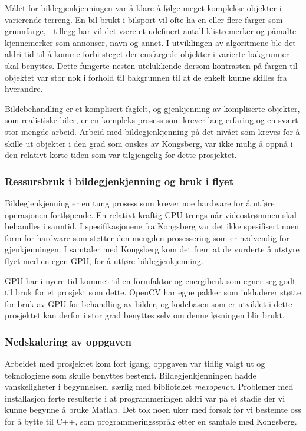 Målet for bildegjenkjenningen var å klare å følge meget komplekse objekter i varierende terreng. En bil brukt i bilsport vil ofte ha en eller flere farger som grunnfarge, i tillegg har vil det være et udefinert antall klistremerker og påmalte kjennemerker som annonser, navn og annet. I utviklingen av algoritmene ble det aldri tid til å komme forbi steget der ensfargede objekter i varierte bakgrunner skal benyttes. Dette fungerte nesten utelukkende dersom kontrasten på fargen til objektet var stor nok i forhold til bakgrunnen til at de enkelt kunne skilles fra hverandre.

Bildebehandling er et komplisert fagfelt, og gjenkjenning av kompliserte objekter, som realistiske biler, er en kompleks prosess som krever lang erfaring og en svært stor mengde arbeid. Arbeid med bildegjenkjenning på det nivået som kreves for å skille ut objekter i den grad som ønskes av Kongsberg, var ikke mulig å oppnå i den relativt korte tiden som var tilgjengelig for dette prosjektet.

\subsubsection{Ressursbruk i bildegjenkjenning og bruk i flyet}

Bildegjenkjenning er en tung prosess som krever noe hardware for å utføre operasjonen fortløpende. En relativt kraftig CPU trengs når videostrømmen skal behandles i sanntid. I spesifikasjonene fra Kongsberg \cite{LocalHawkPDF} var det ikke spesifisert noen form for hardware som støtter den mengden prosessering som er nødvendig for gjenkjenningen. I samtaler med Kongsberg kom det frem at de vurderte å utstyre flyet med en egen GPU, for å utføre bildegjenkjenning. 

GPU har i nyere tid kommet til en formfaktor og energibruk som egner seg godt til bruk for et prosjekt som dette. OpenCV har egne pakker som inkluderer støtte for bruk av GPU for behandling av bilder, og kodebasen som er utviklet i dette prosjektet kan derfor i stor grad benyttes selv om denne løsningen blir brukt.

\subsubsection{Nedskalering av oppgaven}
Arbeidet med prosjektet kom fort igang, oppgaven var tidlig valgt ut og teknologiene som skulle benyttes bestemt. Bildegjenkjenningen hadde vanskeligheter i begynnelsen, særlig med biblioteket \emph{mexopencv}. Problemer med installasjon førte resulterte i at programmeringen aldri var på et stadie der vi kunne begynne å bruke Matlab. Det tok noen uker med forsøk før vi bestemte oss for å bytte til C++, som programmeringsspråk etter en samtale med Kongsberg.

